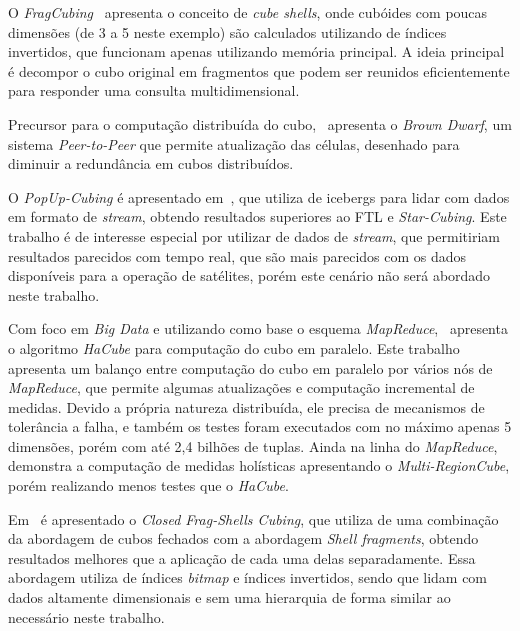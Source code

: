 {\color{cerulean}
O \textit{FragCubing}~\cite{liHighdimensionalOLAPMinimal2004} apresenta o conceito de \textit{cube shells}, onde cubóides com poucas dimensões (de 3 a 5 neste exemplo) são calculados utilizando de índices invertidos, que funcionam apenas utilizando memória principal.
A ideia principal é decompor o cubo original em fragmentos que podem ser reunidos eficientemente para responder uma consulta multidimensional.
}

Precursor para o computação distribuída do cubo,~\cite{dokaBrownDwarfFullydistributed2011} apresenta o \textit{Brown Dwarf}, um sistema \textit{Peer-to-Peer} que permite atualização das células, desenhado para diminuir a redundância em cubos distribuídos.

O \textit{PopUp-Cubing} é apresentado em~\cite{heinePopUpCubingAlgorithmEfficiently2017}, que utiliza de icebergs para lidar com dados em formato de \textit{stream}, obtendo resultados superiores ao FTL e \textit{Star-Cubing}.
{\color{cerulean}
Este trabalho é de interesse especial por utilizar de dados de \textit{stream}, que permitiriam resultados parecidos com tempo real, que são mais parecidos com os dados disponíveis para a operação de satélites, porém este cenário não será abordado neste trabalho.
}

Com foco em \textit{Big Data} e utilizando como base o esquema \textit{MapReduce},~\cite{wangScalableDataCube2013} apresenta o algoritmo \textit{HaCube} para computação do cubo em paralelo.
Este trabalho apresenta um balanço entre computação do cubo em paralelo por vários nós de \textit{MapReduce}, que permite algumas atualizações e computação incremental de medidas.
Devido a própria natureza distribuída, ele precisa de mecanismos de tolerância a falha, e também os testes foram executados com no máximo apenas 5 dimensões, porém com até 2,4 bilhões de tuplas.
Ainda na linha do \textit{MapReduce},~\cite{yangHolisticAlgebraicData2017} demonstra a computação de medidas holísticas apresentando o \textit{Multi-RegionCube}, porém realizando menos testes que o \textit{HaCube}.

Em~\cite{zhaoClosedFragShellsCubing2018} é apresentado o \textit{Closed Frag-Shells Cubing}, que utiliza de uma combinação da abordagem de cubos fechados com a abordagem \textit{Shell fragments}, obtendo resultados melhores que a aplicação de cada uma delas separadamente.
Essa abordagem utiliza de índices \textit{bitmap} e índices invertidos, sendo que lidam com dados altamente dimensionais e sem uma hierarquia de forma similar ao necessário neste trabalho.

